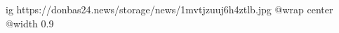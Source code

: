  
 
 
 
 

\ifcmt
  ig https://donbas24.news/storage/news/1mvtjzuuj6h4ztlb.jpg
  @wrap center
  @width 0.9
\fi

